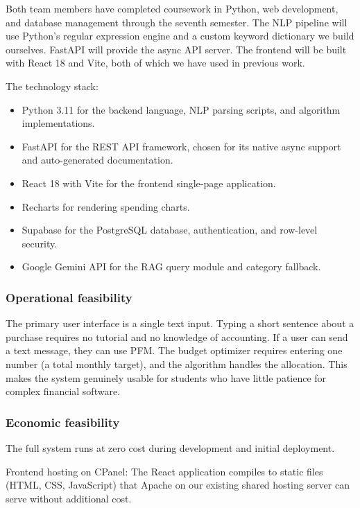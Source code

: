 \documentclass[12pt, a4paper]{article}
\begin{document}
Both team members have completed coursework in Python, web development, and database management through the seventh semester. The NLP pipeline will use Python's regular expression engine and a custom keyword dictionary we build ourselves. FastAPI \cite{fastapi} will provide the async API server. The frontend will be built with React 18 and Vite, both of which we have used in previous work.

The technology stack:
\begin{itemize}
    \item Python 3.11 for the backend language, NLP parsing scripts, and algorithm implementations.
    \item FastAPI \cite{fastapi} for the REST API framework, chosen for its native async support and auto-generated documentation.
    \item React 18 with Vite for the frontend single-page application.
    \item Recharts for rendering spending charts.
    \item Supabase \cite{supabase} for the PostgreSQL database, authentication, and row-level security.
    \item Google Gemini API \cite{gemini} for the RAG query module and category fallback.
\end{itemize}

\subsubsection{Operational feasibility}

The primary user interface is a single text input. Typing a short sentence about a purchase requires no tutorial and no knowledge of accounting. If a user can send a text message, they can use PFM. The budget optimizer requires entering one number (a total monthly target), and the algorithm handles the allocation. This makes the system genuinely usable for students who have little patience for complex financial software.

\subsubsection{Economic feasibility}

The full system runs at zero cost during development and initial deployment.

Frontend hosting on CPanel: The React application compiles to static files (HTML, CSS, JavaScript) that Apache on our existing shared hosting server can serve without additional cost.
\end{document}
